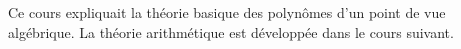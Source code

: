 Ce cours expliquait la théorie basique des polynômes d'un point de vue algébrique. La théorie arithmétique est développée dans le cours suivant.
